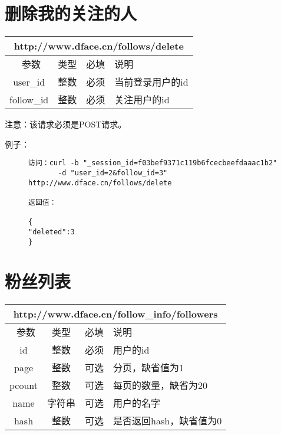 \documentclass[cs4size]{ctexartutf8}
\begin{document}
\section{删除我的关注的人}

\begin{table}[H]
   \begin{center}
\begin{tabular}{|c|c|c|p{12cm}|}
\hline
\multicolumn{4}{|c|}{http://www.dface.cn/follows/delete} \\
\hline\hline
 \  参数  & 类型 & 必填 &  说明  \\
\hline
 user\_id  & 整数 & 必须 &  当前登录用户的id\\
\hline
 follow\_id  & 整数 & 必须 &  关注用户的id\\
\hline
\end{tabular}
   \end{center}
\end{table}

注意：该请求必须是POST请求。

例子：

\begin{figure}[H]
\begin{verbatim}
访问：curl -b "_session_id=f03bef9371c119b6fcecbeefdaaac1b2"
       -d "user_id=2&follow_id=3" http://www.dface.cn/follows/delete

返回值：

{
"deleted":3
}

\end{verbatim}
\end{figure}





\section{粉丝列表}

\begin{table}[H]
   \begin{center}
\begin{tabular}{|c|c|c|p{12cm}|}
\hline
\multicolumn{4}{|c|}{http://www.dface.cn/follow\_info/followers} \\
\hline\hline
 \  参数  & 类型 & 必填 &  说明  \\
\hline
 id  & 整数 & 必须 & 用户的id\\
   \hline
 page  & 整数 & 可选 & 分页，缺省值为1\\ 
 \hline
 pcount  & 整数 & 可选 & 每页的数量，缺省为20\\ 
    \hline
 name  & 字符串 & 可选 & 用户的名字\\ 
    \hline    
 hash  & 整数 & 可选 & 是否返回hash，缺省值为0\\ 
\hline

\end{tabular}
   \end{center}
\end{table}
\end{document}
